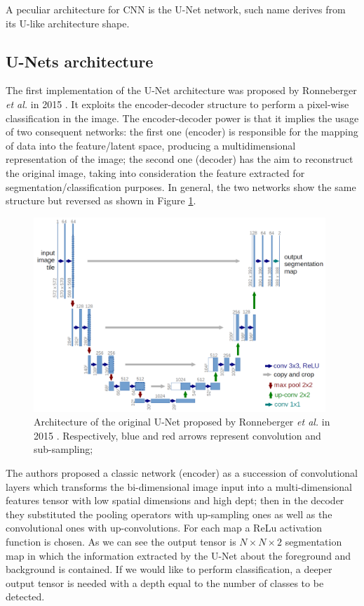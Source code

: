 \documentclass[../main.tex]{subfiles}
\begin{document}
A peculiar architecture for CNN is the U-Net network, such name derives from its U-like architecture shape.



\subsection{U-Nets architecture}

The first implementation of the U-Net architecture was proposed by Ronneberger \textit{et al.} in 2015 \cite{ronneberger2015unet}.
It exploits the encoder-decoder structure to perform a pixel-wise classification in the image.
The encoder-decoder power is that it implies the usage of two consequent networks: the first one (encoder) is responsible for the mapping of data into the feature/latent space, producing a multidimensional representation of the image; the second one (decoder) has the aim to reconstruct the original image, taking into consideration the feature extracted for segmentation/classification purposes.
In general, the two networks show the same structure but reversed as shown in Figure \ref{fig:unet}.

\begin{figure}[H] 
\begin{center}
\includegraphics[width=11cm]{images/u-net-architecture.png}
\caption{\small{Architecture of the original U-Net proposed by Ronneberger \textit{et al.} in 2015 \cite{ronneberger2015unet}. Respectively, blue and red arrows represent convolution and sub-sampling;  }}\label{fig:unet}
\end{center}
\end{figure}
The authors proposed a classic network (encoder) as a succession of convolutional layers which transforms the bi-dimensional image input into a multi-dimensional features tensor with low spatial dimensions and high dept; then in the decoder they substituted the pooling operators with up-sampling ones as well as the convolutional ones with up-convolutions.
For each map a ReLu activation function is chosen.
As we can see the output tensor is $N\times N\times 2$ segmentation map in which the information extracted by the U-Net about the foreground and background is contained.
If we would like to perform classification, a deeper output tensor is needed with a depth equal to the number of classes to be detected.
\end{document}
